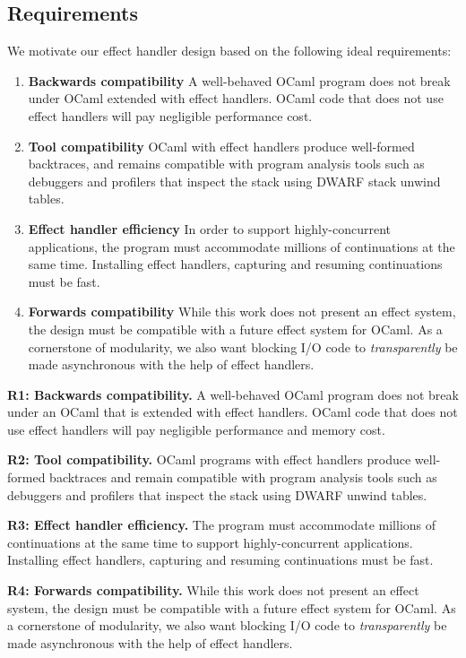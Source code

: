 \documentclass[sigplan,10pt,review,anonymous]{acmart}\settopmatter{printfolios=true,printccs=false,printacmref=false}
\begin{document}
\subsection{Requirements}
\label{sec:req}

We motivate our effect handler design based on the following ideal
requirements:

\begin{enumerate}[label=R\arabic*]
	\item \textbf{Backwards compatibility} A well-behaved OCaml program does not
		break under OCaml extended with effect handlers. OCaml code that does not
		use effect handlers will pay negligible performance cost.
  \item \textbf{Tool compatibility} OCaml with effect handlers produce
    well-formed backtraces, and remains compatible with program analysis tools
    such as debuggers and profilers that inspect the stack using DWARF stack
    unwind tables.
  \item \textbf{Effect handler efficiency} In order to support
    highly-concurrent applications, the program must accommodate millions of
    continuations at the same time. Installing effect handlers, capturing and
    resuming continuations must be fast.
  \item \textbf{Forwards compatibility} While this work does not present an
    effect system, the design must be compatible with a future effect system
    for OCaml. As a cornerstone of modularity, we also want blocking I/O code
    to \emph{transparently} be made asynchronous with the help of effect
    handlers.
\end{enumerate}
\fi

\noindent \textbf{R1: Backwards compatibility.} A well-behaved OCaml program does
not break under an OCaml that is extended with effect handlers. OCaml code that does not
use effect handlers will pay negligible performance and memory cost.

\noindent \textbf{R2: Tool compatibility.} OCaml programs with effect handlers produce
well-formed backtraces and remain compatible with program analysis tools such
as debuggers and profilers that inspect the stack using DWARF unwind
tables.

\noindent \textbf{R3: Effect handler efficiency.} The program must accommodate millions of
continuations at the same time to support
highly-concurrent applications. Installing effect handlers, capturing and
resuming continuations must be fast.

\noindent \textbf{R4: Forwards compatibility.} While this work does not present an
effect system, the design must be compatible with a future effect system for
OCaml. As a cornerstone of modularity, we also want blocking I/O code to
\emph{transparently} be made asynchronous with the help of effect handlers.
\end{document}
